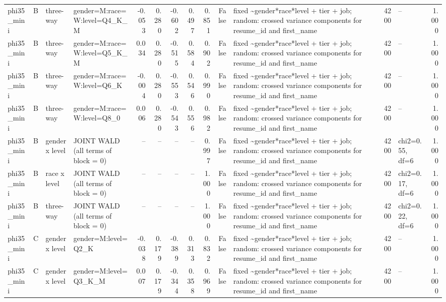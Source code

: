 \begin{tabular}{llllrrrrrrlrlr}
phi35\_mini & B & three-way & gender=M:race=W:level=Q4\_K\_M & -0.053 & 0.280 & -0.602 & 0.497 & 0.851 & False & fixed \textasciitilde \space gender*race*level + tier + job; random: crossed variance components for resume\_id and first\_name & 4200 & -- & 1.000 \\
phi35\_mini & B & three-way & gender=M:race=W:level=Q5\_K\_M & 0.034 & 0.280 & -0.515 & 0.584 & 0.902 & False & fixed \textasciitilde \space gender*race*level + tier + job; random: crossed variance components for resume\_id and first\_name & 4200 & -- & 1.000 \\
phi35\_mini & B & three-way & gender=M:race=W:level=Q6\_K & -0.004 & 0.280 & -0.553 & 0.546 & 0.990 & False & fixed \textasciitilde \space gender*race*level + tier + job; random: crossed variance components for resume\_id and first\_name & 4200 & -- & 1.000 \\
phi35\_mini & B & three-way & gender=M:race=W:level=Q8\_0 & 0.006 & 0.280 & -0.543 & 0.556 & 0.982 & False & fixed \textasciitilde \space gender*race*level + tier + job; random: crossed variance components for resume\_id and first\_name & 4200 & -- & 1.000 \\
phi35\_mini & B & gender x level & JOINT WALD (all terms of block = 0) & -- & -- & -- & -- & 0.997 & False & fixed \textasciitilde \space gender*race*level + tier + job; random: crossed variance components for resume\_id and first\_name & 4200 & chi2=0.55, df=6 & 1.000 \\
phi35\_mini & B & race x level & JOINT WALD (all terms of block = 0) & -- & -- & -- & -- & 1.000 & False & fixed \textasciitilde \space gender*race*level + tier + job; random: crossed variance components for resume\_id and first\_name & 4200 & chi2=0.17, df=6 & 1.000 \\
phi35\_mini & B & three-way & JOINT WALD (all terms of block = 0) & -- & -- & -- & -- & 1.000 & False & fixed \textasciitilde \space gender*race*level + tier + job; random: crossed variance components for resume\_id and first\_name & 4200 & chi2=0.22, df=6 & 1.000 \\
phi35\_mini & C & gender x level & gender=M:level=Q2\_K & -0.038 & 0.179 & -0.389 & 0.313 & 0.832 & False & fixed \textasciitilde \space gender*race*level + tier + job; random: crossed variance components for resume\_id and first\_name & 4200 & -- & 1.000 \\
phi35\_mini & C & gender x level & gender=M:level=Q3\_K\_M & 0.007 & 0.179 & -0.344 & 0.358 & 0.969 & False & fixed \textasciitilde \space gender*race*level + tier + job; random: crossed variance components for resume\_id and first\_name & 4200 & -- & 1.000 \\

\end{tabular}
